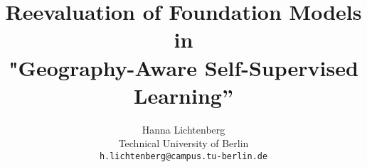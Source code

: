 \documentclass[10pt,twocolumn,letterpaper, pagenumbers]{article}
\title{Reevaluation of Foundation Models in \\"Geography-Aware Self-Supervised Learning”}
\author{Hanna Lichtenberg\\
Technical University of Berlin\\
{\tt\small h.lichtenberg@campus.tu-berlin.de}
}
\begin{document}
\maketitle
    





{
    \small
    
    
}


% 
\end{document}
